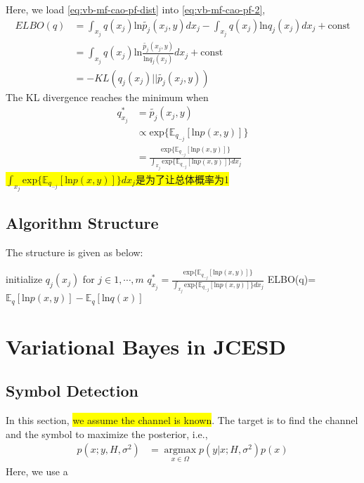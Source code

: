 \documentclass{article}
\begin{document}
Here, we load \eqref{eq:vb-mf-cao-pf-dist} into \eqref{eq:vb-mf-cao-pf-2},
\begin{align}
ELBO(q) &= \int_{x_j}q(x_j)\text{ln}\tilde{p_j}(x_j,y)dx_j - \int_{x_j}q(x_j)\text{ln} q_j(x_j)dx_j + \text{const} \\
&= \int_{x_j}q(x_j)\text{ln}\frac{\tilde{p_j}(x_j,y)}{\text{ln} q_j(x_j)}dx_j+ \text{const} \\
&= -KL(q_j(x_j) || \tilde{p_j}(x_j,y))
\end{align}
The KL divergence reaches the minimum when 
\begin{equation}
\begin{split}
q_{x_j}^* &= \tilde{p_j}(x_j,y) \\
& \propto \text{exp}\{ \mathbb{E}_{q_{-j}}[\text{ln}p(x,y)] \} \\
&= \frac{\text{exp}\{ \mathbb{E}_{q_{-j}}[\text{ln}p(x,y)] \} }{\int_{x_j} \text{exp}\{ \mathbb{E}_{q_{-j}}[\text{ln}p(x,y)] \} dx_j}
\end{split}
\end{equation}
\colorbox{yellow}{$\int_{x_j} \text{exp}\{ \mathbb{E}_{q_{-j}}[\text{ln}p(x,y)] \} dx_j$是为了让总体概率为1}
\subsection{Algorithm Structure}
The structure is given as below:
\begin{breakablealgorithm}
	\begin{algorithmic}[1] %
		\State initialize $q_j(x_j)$ for $j\in{1,\cdots,m}$
				\State $q_{x_j}^*= \frac{\text{exp}\{ \mathbb{E}_{q_{-j}}[\text{ln}p(x,y)] \} }{\int_{x_j} \text{exp}\{ \mathbb{E}_{q_{-j}}[\text{ln}p(x,y)] \} dx_j}$
			\EndFor
			\State ELBO(q)= $\mathbb{E}_q[\text{ln}p(x,y)] - \mathbb{E}_q [\text{ln} q(x)] $
		\EndWhile
		\State {}
	\end{algorithmic}
\end{breakablealgorithm}

\section{Variational Bayes in JCESD}
\subsection{Symbol Detection}
In this section, \colorbox{yellow}{we assume the channel is known}. The target is to find the channel and the symbol to maximize the posterior, i.e.,
\begin{equation}
\begin{split}
p(x; y, H, \sigma^2) &= \mathop{\arg\max}\limits_{x\in \Omega}  p(y|x; H, \sigma^2) p(x)
\end{split}
\end{equation}
Here, we use a 
\end{document}
